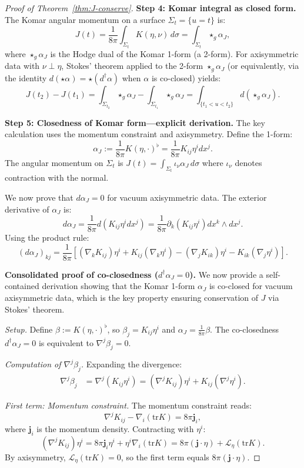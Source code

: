 \documentclass[10pt,a4paper]{amsart}
\newcommand{\momdens}{\boldsymbol{j}}
\newcommand{\tr}{\mathrm{tr}}
\begin{document}
\begin{proof}[Proof of Theorem~\ref{thm:J-conserve}]
\textbf{Step 4: Komar integral as closed form.}
The Komar angular momentum on a surface $\Sigma_t = \{u = t\}$ is:
\[
J(t) = \frac{1}{8\pi} \int_{\Sigma_t} K(\eta, \nu) \, d\sigma = \int_{\Sigma_t} \star_g \alpha_J,
\]
where $\star_g \alpha_J$ is the Hodge dual of the Komar 1-form (a 2-form). For axisymmetric data with $\nu \perp \eta$, Stokes' theorem applied to the 2-form $\star_g \alpha_J$ (or equivalently, via the identity $d(\star \alpha) = \star(d^\dagger \alpha)$ when $\alpha$ is co-closed) yields:
\[
J(t_2) - J(t_1) = \int_{\Sigma_{t_2}} \star_g\alpha_J - \int_{\Sigma_{t_1}} \star_g\alpha_J = \int_{\{t_1 < u < t_2\}} d(\star_g\alpha_J).
\]

\textbf{Step 5: Closedness of Komar form---explicit derivation.}
The key calculation uses the momentum constraint and axisymmetry. Define the 1-form:
\[
\alpha_J := \frac{1}{8\pi} K(\eta, \cdot)^\flat = \frac{1}{8\pi} K_{ij}\eta^i dx^j.
\]
The angular momentum on $\Sigma_t$ is $J(t) = \int_{\Sigma_t} \iota_\nu \alpha_J \, d\sigma$ where $\iota_\nu$ denotes contraction with the normal.

We now prove that $d\alpha_J = 0$ for vacuum axisymmetric data. The exterior derivative of $\alpha_J$ is:
\[
d\alpha_J = \frac{1}{8\pi} d(K_{ij}\eta^i dx^j) = \frac{1}{8\pi} \partial_k(K_{ij}\eta^i) dx^k \wedge dx^j.
\]
Using the product rule:
\begin{equation}\label{eq:dalpha-expansion}
(d\alpha_J)_{kj} = \frac{1}{8\pi}\left[(\nabla_k K_{ij})\eta^i + K_{ij}(\nabla_k \eta^i) - (\nabla_j K_{ik})\eta^i - K_{ik}(\nabla_j \eta^i)\right].
\end{equation}

\textbf{Consolidated proof of co-closedness ($d^\dagger \alpha_J = 0$).}
We now provide a self-contained derivation showing that the Komar 1-form $\alpha_J$ is co-closed for vacuum axisymmetric data, which is the key property ensuring conservation of $J$ via Stokes' theorem.

\textit{Setup.} Define $\beta := K(\eta, \cdot)^\flat$, so $\beta_j = K_{ij}\eta^i$ and $\alpha_J = \frac{1}{8\pi}\beta$. The co-closedness $d^\dagger \alpha_J = 0$ is equivalent to $\nabla^j \beta_j = 0$.

\textit{Computation of $\nabla^j \beta_j$.} Expanding the divergence:
\begin{align}
\nabla^j \beta_j &= \nabla^j (K_{ij}\eta^i) = (\nabla^j K_{ij})\eta^i + K_{ij}(\nabla^j \eta^i). \label{eq:div-beta}
\end{align}

\textit{First term: Momentum constraint.} The momentum constraint reads:
\[
\nabla^j K_{ij} - \nabla_i (\tr K) = 8\pi \momdens_i,
\]
where $\momdens_i$ is the momentum density. Contracting with $\eta^i$:
\[
(\nabla^j K_{ij})\eta^i = 8\pi \momdens_i \eta^i + \eta^i \nabla_i(\tr K) = 8\pi (\momdens \cdot \eta) + \mathcal{L}_\eta(\tr K).
\]
By axisymmetry, $\mathcal{L}_\eta(\tr K) = 0$, so the first term equals $8\pi(\momdens \cdot \eta)$.


\end{proof}
\end{document}
